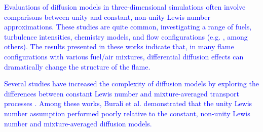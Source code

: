 \documentclass[preprint,review,12pt]{elsarticle}
\begin{document}


\textcolor{blue}{Evaluations of diffusion models in three-dimensional simulations often involve comparisons between unity and constant, non-unity Lewis number approximations.
These studies are quite common, investigating a range of fuels, turbulence intensities, chemistry models, and flow configurations (e.g. \cite{Savard2015,Savard2015structure,Lapointe:2015,Burali2016AssessmentFlows}, among others).  
The results presented in these works indicate that, in many flame configurations with various fuel/air mixtures, differential diffusion effects can dramatically change the structure of the flame.}  %

\textcolor{blue}{Several studies have increased the complexity of diffusion models by exploring the differences between constant Lewis number and mixture-averaged transport processes \cite{Burali2016AssessmentFlows,Dinesh:2016,Aspden:2017}.
Among these works, Burali et al. \cite{Burali2016AssessmentFlows} demonstrated that the unity Lewis number assumption performed poorly relative to the constant, non-unity Lewis number and mixture-averaged diffusion models.}
\end{document}
